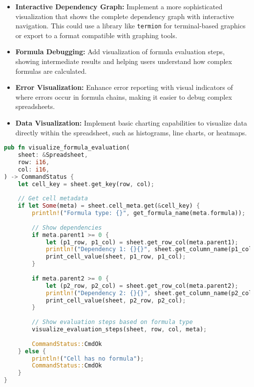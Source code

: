 \documentclass[11pt,a4paper]{article}
\begin{document}
\begin{itemize}
  \item \textbf{Interactive Dependency Graph:} Implement a more sophisticated visualization that shows the complete dependency graph with interactive navigation. This could use a library like \lstinline{termion} for terminal-based graphics or export to a format compatible with graphing tools.
  
  \item \textbf{Formula Debugging:} Add visualization of formula evaluation steps, showing intermediate results and helping users understand how complex formulas are calculated.
  
  \item \textbf{Error Visualization:} Enhance error reporting with visual indicators of where errors occur in formula chains, making it easier to debug complex spreadsheets.
  
  \item \textbf{Data Visualization:} Implement basic charting capabilities to visualize data directly within the spreadsheet, such as histograms, line charts, or heatmaps.
\end{itemize}

\begin{lstlisting}[language=Rust, caption={Potential implementation of enhanced visualization}, label=lst:viz-extension]
pub fn visualize_formula_evaluation(
    sheet: &Spreadsheet,
    row: i16,
    col: i16,
) -> CommandStatus {
    let cell_key = sheet.get_key(row, col);
    
    // Get cell metadata
    if let Some(meta) = sheet.cell_meta.get(&cell_key) {
        println!("Formula type: {}", get_formula_name(meta.formula));
        
        // Show dependencies
        if meta.parent1 >= 0 {
            let (p1_row, p1_col) = sheet.get_row_col(meta.parent1);
            println!("Dependency 1: {}{}", sheet.get_column_name(p1_col), p1_row + 1);
            print_cell_value(sheet, p1_row, p1_col);
        }
        
        if meta.parent2 >= 0 {
            let (p2_row, p2_col) = sheet.get_row_col(meta.parent2);
            println!("Dependency 2: {}{}", sheet.get_column_name(p2_col), p2_row + 1);
            print_cell_value(sheet, p2_row, p2_col);
        }
        
        // Show evaluation steps based on formula type
        visualize_evaluation_steps(sheet, row, col, meta);
        
        CommandStatus::CmdOk
    } else {
        println!("Cell has no formula");
        CommandStatus::CmdOk
    }
}
\end{lstlisting}
\end{document}
